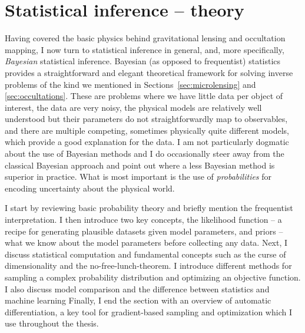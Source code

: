 \documentclass[12pt,dvipsnames]{report}
\begin{document}
\section{Statistical inference -- theory}
\label{sec:inference_intro}
Having covered the basic physics behind gravitational lensing and occultation mapping, I
now turn to statistical inference in general, and, more specifically,
\emph{Bayesian} statistical inference. Bayesian (as opposed to frequentist) statistics
provides a straightforward and elegant theoretical framework for solving inverse
problems of the kind we mentioned
in Sections~\ref{sec:microlensing}  and \ref{sec:occultations}. These are problems
where we have little data per object of interest, the data are very noisy,
the physical models are relatively well understood but their parameters do not
straightforwardly map to observables, and there are multiple competing, sometimes
physically  quite different models, which provide a good explanation for the data.
I am not particularly dogmatic about the use of Bayesian methods
and I do occasionally steer away from the classical Bayesian approach and point out where
a less Bayesian method is superior in practice.  What is most important is the
use of \emph{probabilities} for encoding uncertainty about the physical world.

I start by reviewing basic probability theory and briefly mention the
frequentist interpretation. I then introduce two key concepts, the likelihood
function -- a recipe for generating plausible datasets given model parameters,
and priors -- what we know about the model parameters before collecting any
data. Next, I discuss statistical computation and fundamental concepts such as the curse of
dimensionality and the no-free-lunch-theorem. I introduce different methods for sampling 
a complex probability distribution and optimizing an objective function. 
I also discuss model comparison and the difference between statistics and machine learning
Finally, I end the section with an overview of automatic differentiation, a key tool 
for gradient-based sampling and optimization which I use throughout the thesis.
\end{document}
